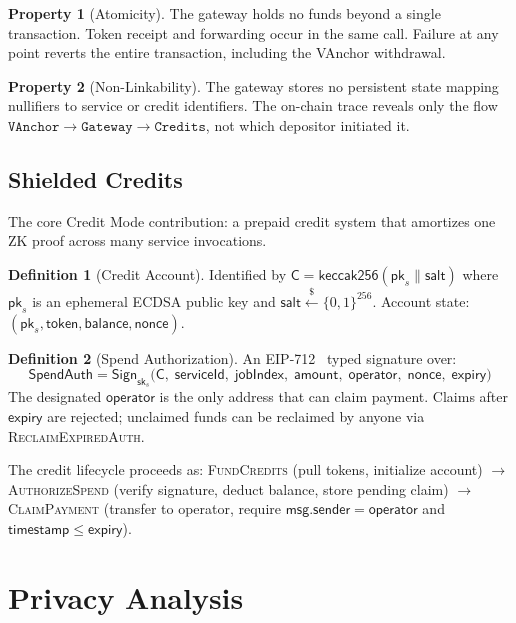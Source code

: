 \documentclass[11pt,a4paper]{article}
\theoremstyle{definition}
\newtheorem{definition}{Definition}
\newtheorem{property}{Property}
\begin{document}
\begin{property}[Atomicity]
The gateway holds no funds beyond a single transaction. Token receipt and forwarding occur in the same call. Failure at any point reverts the entire transaction, including the VAnchor withdrawal.
\end{property}

\begin{property}[Non-Linkability]
The gateway stores no persistent state mapping nullifiers to service or credit identifiers. The on-chain trace reveals only the flow $\texttt{VAnchor} \to \texttt{Gateway} \to \texttt{Credits}$, not which depositor initiated it.
\end{property}

\subsection{Shielded Credits}\label{sec:credits}

The core Credit Mode contribution: a prepaid credit system that amortizes one ZK proof across many service invocations.

\begin{definition}[Credit Account]
Identified by $\mathsf{C} = \mathsf{keccak256}(\mathsf{pk}_s \| \mathsf{salt})$ where $\mathsf{pk}_s$ is an ephemeral ECDSA public key and $\mathsf{salt} \xleftarrow{\$} \{0,1\}^{256}$. Account state: $(\mathsf{pk}_s, \mathsf{token}, \mathsf{balance}, \mathsf{nonce})$.
\end{definition}

\begin{definition}[Spend Authorization]
An EIP-712~\cite{eip712} typed signature over:
$$\mathsf{SpendAuth} = \mathsf{Sign}_{\mathsf{sk}_s}\big(\mathsf{C},\; \mathsf{serviceId},\; \mathsf{jobIndex},\; \mathsf{amount},\; \mathsf{operator},\; \mathsf{nonce},\; \mathsf{expiry}\big)$$
The designated $\mathsf{operator}$ is the only address that can claim payment. Claims after $\mathsf{expiry}$ are rejected; unclaimed funds can be reclaimed by anyone via \textsc{ReclaimExpiredAuth}.
\end{definition}

The credit lifecycle proceeds as: \textsc{FundCredits} (pull tokens, initialize account) $\to$ \textsc{AuthorizeSpend} (verify signature, deduct balance, store pending claim) $\to$ \textsc{ClaimPayment} (transfer to operator, require $\mathsf{msg.sender} = \mathsf{operator}$ and $\mathsf{timestamp} \leq \mathsf{expiry}$).

\section{Privacy Analysis}
\end{document}
